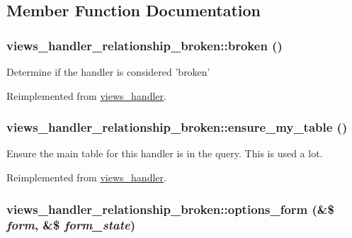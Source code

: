 \subsection{Member Function Documentation}
\hypertarget{classviews__handler__relationship__broken_c4e5826e70953e7ec16f50ec264fdb53}{
\subsubsection[{broken}]{\setlength{\rightskip}{0pt plus 5cm}views\_\-handler\_\-relationship\_\-broken::broken ()}}
\label{classviews__handler__relationship__broken_c4e5826e70953e7ec16f50ec264fdb53}


Determine if the handler is considered 'broken' 

Reimplemented from \hyperlink{classviews__handler_c1cd2ff30cb558c79cc908be516fb725}{views\_\-handler}.\hypertarget{classviews__handler__relationship__broken_cea2731924b5f5e3b83776f237b3ff67}{
\subsubsection[{ensure\_\-my\_\-table}]{\setlength{\rightskip}{0pt plus 5cm}views\_\-handler\_\-relationship\_\-broken::ensure\_\-my\_\-table ()}}
\label{classviews__handler__relationship__broken_cea2731924b5f5e3b83776f237b3ff67}


Ensure the main table for this handler is in the query. This is used a lot. 

Reimplemented from \hyperlink{classviews__handler_947f21ef0f21a77f4d103af4702b3600}{views\_\-handler}.\hypertarget{classviews__handler__relationship__broken_a421a42866d049732e8747669466ae0e}{
\subsubsection[{options\_\-form}]{\setlength{\rightskip}{0pt plus 5cm}views\_\-handler\_\-relationship\_\-broken::options\_\-form (\&\$ {\em form}, \/  \&\$ {\em form\_\-state})}}
\label{classviews__handler__relationship__broken_a421a42866d049732e8747669466ae0e}


